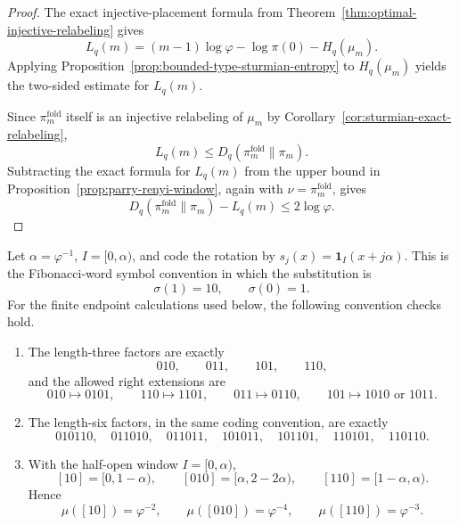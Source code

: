 \begin{proof}
The exact injective-placement formula from
Theorem~\ref{thm:optimal-injective-relabeling} gives
\[
L_q(m)
=
(m-1)\log\varphi-\log\pi(0)-H_q(\mu_m).
\]
Applying Proposition~\ref{prop:bounded-type-sturmian-entropy} to
\(H_q(\mu_m)\) yields the two-sided estimate for \(L_q(m)\).

Since \(\pi_m^{\mathrm{fold}}\) itself is an injective relabeling of
\(\mu_m\) by Corollary~\ref{cor:sturmian-exact-relabeling},
\[
L_q(m)\le D_q(\pi_m^{\mathrm{fold}}\|\pi_m).
\]
Subtracting the exact formula for \(L_q(m)\) from the upper bound in
Proposition~\ref{prop:parry-renyi-window}, again with
\(\nu=\pi_m^{\mathrm{fold}}\), gives
\[
D_q(\pi_m^{\mathrm{fold}}\|\pi_m)-L_q(m)\le 2\log\varphi.
\]
\end{proof}

\begin{lemma}
\label{lem:golden-slope-coding-audit}
Let \(\alpha=\varphi^{-1}\), \(I=[0,\alpha)\), and code the rotation by
\(s_j(x)=\mathbf 1_I(x+j\alpha)\).  This is the Fibonacci-word symbol
convention in which the substitution is
\[
\sigma(1)=10,\qquad \sigma(0)=1.
\]
For the finite endpoint calculations used below, the following convention
checks hold.
\begin{enumerate}
\item The length-three factors are exactly
\[
010,\qquad 011,\qquad 101,\qquad 110,
\]
and the allowed right extensions are
\[
010\mapsto 0101,\qquad
110\mapsto 1101,\qquad
011\mapsto 0110,\qquad
101\mapsto 1010\text{ or }1011 .
\]
\item The length-six factors, in the same coding convention, are exactly
\[
010110,\quad 011010,\quad 011011,\quad 101011,\quad 101101,\quad
110101,\quad 110110 .
\]
\item With the half-open window \(I=[0,\alpha)\),
\[
[10]=[0,1-\alpha),\qquad
[010]=[\alpha,2-2\alpha),\qquad
[110]=[1-\alpha,\alpha).
\]
Hence
\[
\mu([10])=\varphi^{-2},\qquad
\mu([010])=\varphi^{-4},\qquad
\mu([110])=\varphi^{-3}.
\]
\end{enumerate}
\end{lemma}


